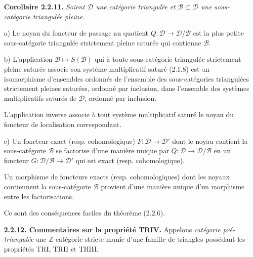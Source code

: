 \clearpage
{}%
\begingroup
\small
\setlength{\parskip}{0pt}%
\setlength{\emergencystretch}{1.5em}%

\noindent\textbf{Corollaire 2.2.11.}\quad
\begingroup\itshape
{}%
Soient $\mathcal D$ une catégorie triangulée et
$\mathcal B\subset\mathcal D$ une sous-catégorie triangulée pleine.

\par\noindent a) Le noyau du foncteur de passage au quotient
$Q\colon\mathcal D\longrightarrow\mathcal D/\mathcal B$ est la plus
petite sous-catégorie triangulée strictement pleine saturée qui contienne
$\mathcal B$.

\par\noindent b) L'application
$\mathcal B\longmapsto S(\mathcal B)$ qui à toute sous-catégorie
triangulée strictement pleine saturée associe son système multiplicatif
saturé (2.1.8) est un isomorphisme d'ensembles ordonnés de l'ensemble des
sous-catégories triangulées strictement pleines saturées, ordonné par
inclusion, dans l'ensemble des systèmes multiplicatifs saturés de
$\mathcal D$, ordonné par inclusion.

L'application inverse associe à tout système multiplicatif saturé le noyau
du foncteur de localisation correspondant.

\par\noindent c) Un foncteur exact (resp. cohomologique)
$F\colon\mathcal D\longrightarrow\mathcal D'$ dont le noyau contient la
sous-catégorie $\mathcal B$ se factorise d'une manière unique par
$Q\colon\mathcal D\longrightarrow\mathcal D/\mathcal B$ en un foncteur
$G\colon\mathcal D/\mathcal B\longrightarrow\mathcal D'$ qui est exact
(resp. cohomologique).

Un morphisme de foncteurs exacts (resp. cohomologiques) dont les noyaux
contiennent la sous-catégorie $\mathcal B$ provient d'une manière unique
d'un morphisme entre les factorisations.
\endgroup

Ce sont des conséquences faciles du théorème (2.2.6).

\smallskip
\noindent\textbf{2.2.12. Commentaires sur la propriété TRIV.}
%
Appelons \emph{catégorie pré-triangulée} une $\mathbb Z$-catégorie stricte
munie d'une famille de triangles possédant les propriétés TRI, TRII et
TRIII.

